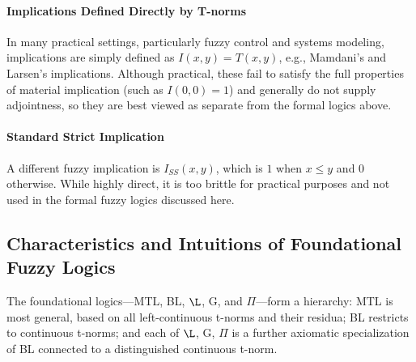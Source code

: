 \paragraph{Implications Defined Directly by T-norms}
In many practical settings, particularly fuzzy control and systems modeling, implications are simply defined as $I(x, y) = T(x, y)$, e.g., Mamdani's and Larsen's implications. Although practical, these fail to satisfy the full properties of material implication (such as $I(0,0) = 1$) and generally do not supply adjointness, so they are best viewed as separate from the formal logics above.

\paragraph{Standard Strict Implication}
A different fuzzy implication is $I_{SS}(x,y)$, which is $1$ when $x\le y$ and $0$ otherwise. While highly direct, it is too brittle for practical purposes and not used in the formal fuzzy logics discussed here.

\subsection{Characteristics and Intuitions of Foundational Fuzzy Logics}

The foundational logics—MTL, BL, $\L$, G, and $\Pi$—form a hierarchy: MTL is most general, based on all left-continuous t-norms and their residua; BL restricts to continuous t-norms; and each of $\L$, G, $\Pi$ is a further axiomatic specialization of BL connected to a distinguished continuous t-norm.


